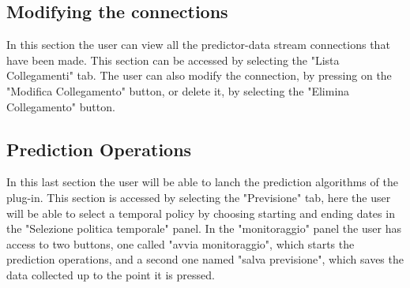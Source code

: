 \subsection{Modifying the connections}
In this section the user can view all the predictor-data stream connections that have been made. This section can be accessed by selecting the "Lista Collegamenti" tab.
The user can also modify the connection, by pressing on the "Modifica Collegamento" button, or delete it, by selecting the "Elimina Collegamento" button.

\subsection{Prediction Operations}
In this last section the user will be able to lanch the prediction algorithms of the plug-in.
This section is accessed by selecting the "Previsione" tab, here the user will be able to select a temporal policy by choosing starting and ending dates in the "Selezione politica temporale" panel.
In the "monitoraggio" panel the user has access to two buttons, one called "avvia monitoraggio", which starts the prediction operations, and a second one named "salva previsione", which saves the data collected up to the point it is pressed. 

